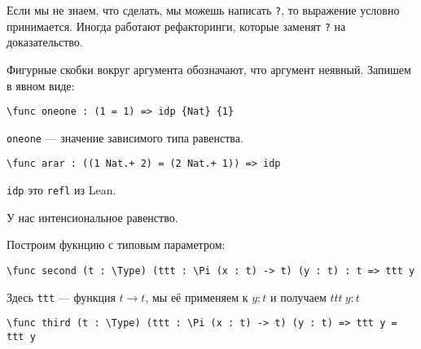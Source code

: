 Если мы не знаем, что сделать, мы можешь написать \texttt{?}, то выражение условно принимается. Иногда работают рефакторинги, которые заменят \texttt{?} на доказательство.

Фигурные скобки вокруг аргумента обозначают, что аргумент неявный. Запишем в явном виде:

\begin{verbatim}
\func oneone : (1 = 1) => idp {Nat} {1}
\end{verbatim}

\texttt{oneone} --- значение зависимого типа равенства.

\begin{verbatim}
\func arar : ((1 Nat.+ 2) = (2 Nat.+ 1)) => idp
\end{verbatim}

\texttt{idp} это \texttt{refl} из Lean.

У нас интенсиональное равенство.

Построим фукнцию с типовым параметром:
\begin{verbatim}
\func second (t : \Type) (ttt : \Pi (x : t) -> t) (y : t) : t => ttt y
\end{verbatim}
Здесь \texttt{ttt} --- функция \(t \to t\), мы её применяем к \(y : t\) и получаем \(ttt\ y : t\)

\begin{verbatim}
\func third (t : \Type) (ttt : \Pi (x : t) -> t) (y : t) => ttt y = ttt y
\end{verbatim}
